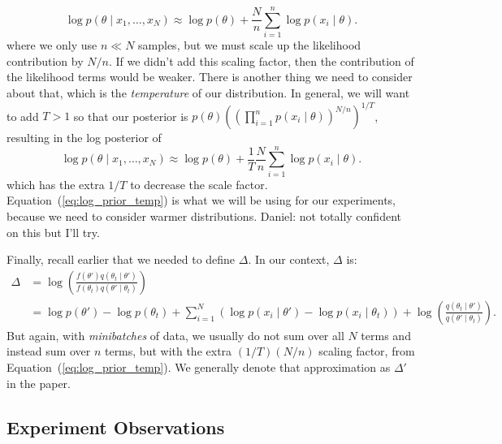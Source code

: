 \documentclass{article}
\begin{document}
\begin{equation}\label{eq:scaling_factor}
\log p(\theta \mid x_1,\ldots,x_N) \approx \log p(\theta) + \frac{N}{n} \sum_{i=1}^n\log p(x_i \mid \theta).
\end{equation}
where we only use $n \ll N$ samples, but we must scale up the likelihood contribution by $N/n$. If we
didn't add this scaling factor, then the contribution of the likelihood terms would be weaker. There
is another thing we need to consider about that, which is the \emph{temperature} of our
distribution. In general, we will want to add $T > 1$ so that our posterior is
$p(\theta)((\prod_{i=1}^n p(x_i\mid \theta))^{N/n})^{1/T}$, resulting in the log
posterior of 
\begin{equation}\label{eq:log_prior_temp}
\log p(\theta \mid x_1,\ldots,x_N) \approx \log p(\theta) + \frac{1}{T}\frac{N}{n} \sum_{i=1}^n\log p(x_i \mid \theta).
\end{equation}
which has the extra $1/T$ to decrease the scale factor.  Equation~(\ref{eq:log_prior_temp}) is what
we will be using for our experiments, because we need to consider warmer distributions.
{\color{blue} Daniel: not totally confident on this but I'll try.}

Finally, recall earlier that we needed to define $\Delta$. In our context, $\Delta$ is:
\begin{align}
\Delta &= \log \left(\frac{f(\theta') q(\theta_t \mid \theta')}{f(\theta_t) q(\theta'\mid \theta_t)} \right) \\
&= \log p(\theta') - \log p(\theta_t) + \sum_{i=1}^N(\log p(x_i \mid \theta') - \log p(x_i \mid \theta_t)) + \log\left(\frac{q(\theta_t \mid \theta')}{q(\theta' \mid \theta_t)}\right).
\end{align}
But again, with \emph{minibatches} of data, we usually do not sum over all $N$ terms and instead sum
over $n$ terms, but with the extra $(1/T)(N/n)$ scaling factor, from
Equation~(\ref{eq:log_prior_temp}). We generally denote that approximation as $\Delta'$ in the paper.

\subsection{Experiment Observations}
\end{document}
